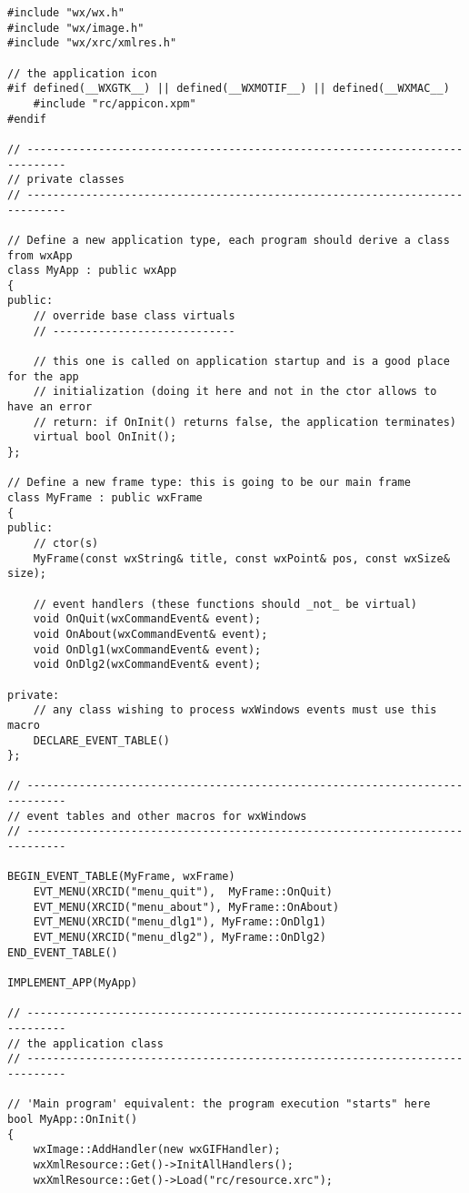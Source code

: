 \begin{verbatim}
#include "wx/wx.h"
#include "wx/image.h"
#include "wx/xrc/xmlres.h"

// the application icon
#if defined(__WXGTK__) || defined(__WXMOTIF__) || defined(__WXMAC__)
    #include "rc/appicon.xpm"
#endif

// ----------------------------------------------------------------------------
// private classes
// ----------------------------------------------------------------------------

// Define a new application type, each program should derive a class from wxApp
class MyApp : public wxApp
{
public:
    // override base class virtuals
    // ----------------------------

    // this one is called on application startup and is a good place for the app
    // initialization (doing it here and not in the ctor allows to have an error
    // return: if OnInit() returns false, the application terminates)
    virtual bool OnInit();
};

// Define a new frame type: this is going to be our main frame
class MyFrame : public wxFrame
{
public:
    // ctor(s)
    MyFrame(const wxString& title, const wxPoint& pos, const wxSize& size);

    // event handlers (these functions should _not_ be virtual)
    void OnQuit(wxCommandEvent& event);
    void OnAbout(wxCommandEvent& event);
    void OnDlg1(wxCommandEvent& event);
    void OnDlg2(wxCommandEvent& event);

private:
    // any class wishing to process wxWindows events must use this macro
    DECLARE_EVENT_TABLE()
};

// ----------------------------------------------------------------------------
// event tables and other macros for wxWindows
// ----------------------------------------------------------------------------

BEGIN_EVENT_TABLE(MyFrame, wxFrame)
    EVT_MENU(XRCID("menu_quit"),  MyFrame::OnQuit)
    EVT_MENU(XRCID("menu_about"), MyFrame::OnAbout)
    EVT_MENU(XRCID("menu_dlg1"), MyFrame::OnDlg1)
    EVT_MENU(XRCID("menu_dlg2"), MyFrame::OnDlg2)
END_EVENT_TABLE()

IMPLEMENT_APP(MyApp)

// ----------------------------------------------------------------------------
// the application class
// ----------------------------------------------------------------------------

// 'Main program' equivalent: the program execution "starts" here
bool MyApp::OnInit()
{
    wxImage::AddHandler(new wxGIFHandler);
    wxXmlResource::Get()->InitAllHandlers();
    wxXmlResource::Get()->Load("rc/resource.xrc");


\end{verbatim}
